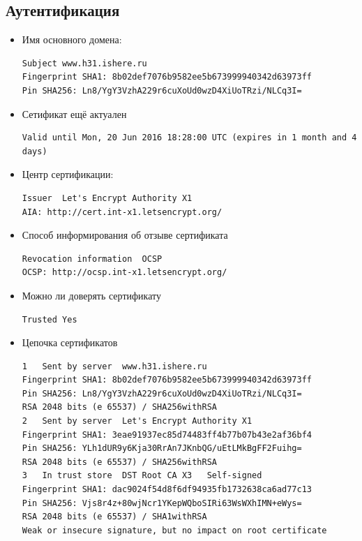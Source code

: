 \subsection{Аутентификация}
\begin{itemize}
	\item Имя основного домена:
	\begin{lstlisting}
Subject	www.h31.ishere.ru 
Fingerprint SHA1: 8b02def7076b9582ee5b673999940342d63973ff
Pin SHA256: Ln8/YgY3VzhA229r6cuXoUd0wzD4XiUoTRzi/NLCq3I=
	\end{lstlisting}
	
	\item Сетификат ещё актуален
	\begin{lstlisting}
Valid until	Mon, 20 Jun 2016 18:28:00 UTC (expires in 1 month and 4 days)
	\end{lstlisting}
	
	\item Центр сертификации:
	\begin{lstlisting}
Issuer	Let's Encrypt Authority X1 
AIA: http://cert.int-x1.letsencrypt.org/
	\end{lstlisting}
	
	\item Способ информирования об отзыве сертификата
	\begin{lstlisting}
Revocation information	OCSP 
OCSP: http://ocsp.int-x1.letsencrypt.org/ 
	\end{lstlisting}
	
	\item Можно ли доверять сертификату
	\begin{lstlisting}
Trusted	Yes
	\end{lstlisting}
	
	\item Цепочка сертификатов
	\begin{lstlisting}
1	Sent by server	www.h31.ishere.ru 
Fingerprint SHA1: 8b02def7076b9582ee5b673999940342d63973ff
Pin SHA256: Ln8/YgY3VzhA229r6cuXoUd0wzD4XiUoTRzi/NLCq3I= 
RSA 2048 bits (e 65537)	/ SHA256withRSA
2	Sent by server	Let's Encrypt Authority X1 
Fingerprint SHA1: 3eae91937ec85d74483ff4b77b07b43e2af36bf4
Pin SHA256: YLh1dUR9y6Kja30RrAn7JKnbQG/uEtLMkBgFF2Fuihg= 
RSA 2048 bits (e 65537)	/ SHA256withRSA
3	In trust store	DST Root CA X3   Self-signed	
Fingerprint SHA1: dac9024f54d8f6df94935fb1732638ca6ad77c13
Pin SHA256: Vjs8r4z+80wjNcr1YKepWQboSIRi63WsWXhIMN+eWys= 
RSA 2048 bits (e 65537)	/ SHA1withRSA 
Weak or insecure signature, but no impact on root certificate
	\end{lstlisting}
	

\end{itemize}
